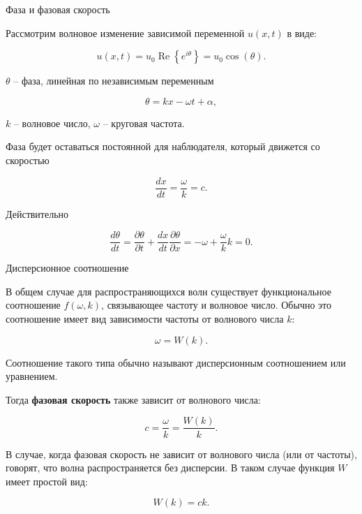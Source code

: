 \documentclass[10pt,xcolor=pst,aspectratio=169]{beamer}
\begin{document}
\begin{frame}{Фаза и фазовая скорость}

    \transdissolve[duration=0.1]
    \justifying
    \large

    Рассмотрим волновое изменение зависимой переменной $u \left( x, t \right)$ в виде:

    \[
        u \left( x, t \right) = u_{0} \operatorname{Re} \left\lbrace e^{i \theta} \right\rbrace = u_{0} \cos \left( \theta \right) .
    \]

    $\theta$ -- фаза, линейная по независимым переменным

    \[
        \theta = k x - \omega t + \alpha,
    \]

    $k$ -- волновое число, $\omega$ -- круговая частота.

    Фаза будет оставаться постоянной для наблюдателя, который движется со скоростью

    \[
        \frac{d x}{d t} = \frac{\omega}{k} = c.
    \]

    Действительно

    \[
        \frac{d \theta}{d t} = \frac{\partial \theta}{\partial t} + \frac{d x}{d t} \frac{\partial \theta}{\partial x} = - \omega + \frac{\omega}{k} k = 0.
    \]

\end{frame}

\begin{frame}{Дисперсионное соотношение}

    \transdissolve[duration=0.1]
    \justifying
    \large

    В общем случае для распространяющихся волн существует функциональное соотношение $f \left( \omega, k \right)$, связывающее частоту и волновое число. Обычно это соотношение имеет вид зависимости частоты от волнового числа $k$:

    \[
        \omega = W \left( k \right).
    \]

    Соотношение такого типа обычно называют дисперсионным соотношением или уравнением.

    Тогда \textbf{фазовая скорость} также зависит от волнового числа:

    \[
        c = \frac{\omega}{k} = \frac{W \left( k \right)}{k}.
    \]

    В случае, когда фазовая скорость не зависит от волнового числа (или от частоты), говорят, что волна распространяется без дисперсии. В таком случае функция $W$ имеет простой вид:

    \[
        W \left( k \right) = c k.
    \]

\end{frame}
\end{document}
